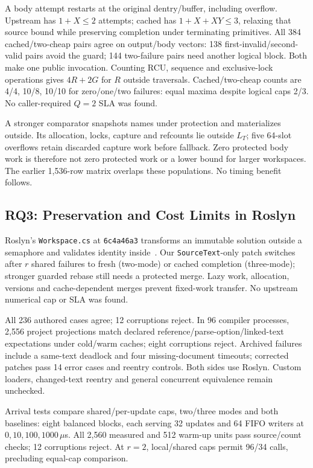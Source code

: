 \documentclass[acmsmall,screen,review,anonymous]{acmart}
\begin{document}
A body attempt restarts at the original dentry/buffer, including overflow. Upstream has $1+X\le 2$ attempts; cached has $1+X+XY\le 3$, relaxing that source bound while preserving completion under terminating primitives. All 384 cached/two-cheap pairs agree on output/body vectors: 138 first-invalid/second-valid pairs avoid the guard; 144 two-failure pairs need another logical block. Both make one public invocation. Counting RCU, sequence and exclusive-lock operations gives $4R+2G$ for $R$ outside traversals. Cached/two-cheap counts are 4/4, 10/8, 10/10 for zero/one/two failures: equal maxima despite logical caps 2/3. No caller-required $Q=2$ SLA was found.

A stronger comparator snapshots names under protection and materializes outside. Its allocation, locks, capture and refcounts lie outside $L_T$; five 64-slot overflows retain discarded capture work before fallback. Zero protected body work is therefore not zero protected work or a lower bound for larger workspaces. The earlier 1,536-row matrix overlaps these populations. No timing benefit follows.

\subsection{RQ3: Preservation and Cost Limits in Roslyn}
\label{sec:deephaven}

Roslyn's \texttt{Workspace.cs} at \texttt{6c4a46a3} transforms an immutable solution outside a semaphore and validates identity inside~\cite{roslynSource,roslynPR}. Our \texttt{SourceText}-only patch switches after $r$ shared failures to fresh (two-mode) or cached completion (three-mode); stronger guarded rebase still needs a protected merge. Lazy work, allocation, versions and cache-dependent merges prevent fixed-work transfer. No upstream numerical cap or SLA was found.

All 236 authored cases agree; 12 corruptions reject. In 96 compiler processes, 2,556 project projections match declared reference/parse-option/linked-text expectations under cold/warm caches; eight corruptions reject. Archived failures include a same-text deadlock and four missing-document timeouts; corrected patches pass 14 error cases and reentry controls. Both sides use Roslyn. Custom loaders, changed-text reentry and general concurrent equivalence remain unchecked.

Arrival tests compare shared/per-update caps, two/three modes and both baselines: eight balanced blocks, each serving 32 updates and 64 FIFO writers at $0, 10,100, 1000\,\mu$s. All 2,560 measured and 512 warm-up units pass source/count checks; 12 corruptions reject. At $r=2$, local/shared caps permit 96/34 calls, precluding equal-cap comparison.
\end{document}
